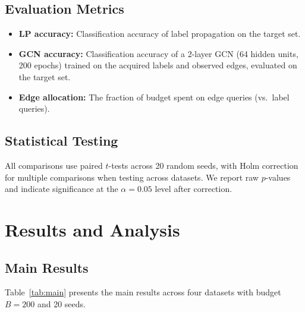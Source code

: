 \documentclass[12pt,a4paper,oneside]{report}
\begin{document}
\section{Evaluation Metrics}

\begin{itemize}[leftmargin=2em]
    \item \textbf{LP accuracy:} Classification accuracy of label propagation on the target set.
    \item \textbf{GCN accuracy:} Classification accuracy of a 2-layer GCN (64 hidden units, 200 epochs) trained on the acquired labels and observed edges, evaluated on the target set.
    \item \textbf{Edge allocation:} The fraction of budget spent on edge queries (vs.\ label queries).
\end{itemize}

\section{Statistical Testing}

All comparisons use paired $t$-tests across 20 random seeds, with Holm correction for multiple comparisons when testing across datasets. We report raw $p$-values and indicate significance at the $\alpha = 0.05$ level after correction.


\chapter{Results and Analysis}
\label{ch:results}

\section{Main Results}


Table~\ref{tab:main} presents the main results across four datasets with budget $B = 200$ and 20 seeds.
\end{document}
